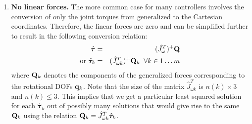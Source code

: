 \begin{enumerate}
\item \textbf{No linear forces. } The more common case for many controllers involves the conversion of only the joint torques from generalized to the Cartesian coordinates. Therefore, the linear forces  are zero and  can be simplified further to result in the following conversion relation:
\begin{eqnarray}
\nonumber
\hat{\bm{\tau}}  & = & (\hat{J}_{\omega}^T)^+ \mathbf{Q}\\
\mbox{or } \hat{\bm{\tau}}_k  & = & (\hat{J}_{\omega k}^T)^+ \mathbf{Q}_k \;\; \forall k \in 1\hdots m
\end{eqnarray}
where $\mathbf{Q}_k$ denotes the components of the generalized forces corresponding to the rotational DOFs $\mathbf{q}_k$. Note that the size of the matrix $\hat{J}_{\omega k}^T$ is $n(k)\times 3$ and $n(k)\leq 3$. This implies that we get a particular least squared solution for each $\hat{\bm{\tau}}_k$ out of possibly many solutions that would give rise to the same $\mathbf{Q}_k$ using the relation $\mathbf{Q}_k = \hat{J}_{\omega k}^T \hat{\bm{\tau}}_k$.

\end{enumerate}

